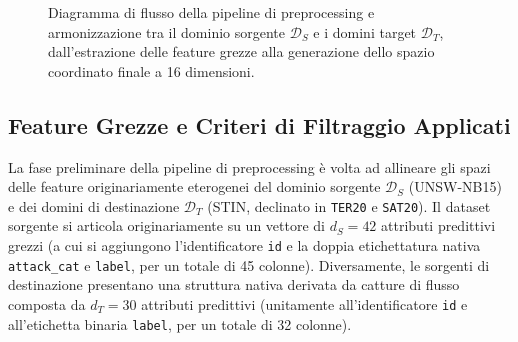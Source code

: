 \begin{figure}[H]
\caption{Diagramma di flusso della pipeline di preprocessing e armonizzazione tra il dominio sorgente $\mathcal{D}_S$ e i domini target $\mathcal{D}_T$, dall'estrazione delle feature grezze alla generazione dello spazio coordinato finale a 16 dimensioni.}
\label{fig:preprocessing_pipeline}
\end{figure}

\subsection{Feature Grezze e Criteri di Filtraggio Applicati}
\label{subsec:feature_grezze}

La fase preliminare della pipeline di preprocessing è volta ad allineare gli spazi delle feature originariamente eterogenei del dominio sorgente $\mathcal{D}_S$ (UNSW-NB15) e dei domini di destinazione $\mathcal{D}_T$ (STIN, declinato in \texttt{TER20} e \texttt{SAT20}). 
Il dataset sorgente si articola originariamente su un vettore di $d_S = 42$ attributi predittivi grezzi (a cui si aggiungono l'identificatore \texttt{id} e la doppia etichettatura nativa \texttt{attack\_cat} e \texttt{label}, per un totale di 45 colonne). 
Diversamente, le sorgenti di destinazione presentano una struttura nativa derivata da catture di flusso composta da $d_T = 30$ attributi predittivi (unitamente all'identificatore \texttt{id} e all'etichetta binaria \texttt{label}, per un totale di 32 colonne).

